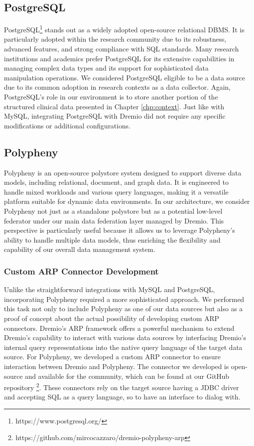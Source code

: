 \subsection{PostgreSQL}
PostgreSQL\footnote{https://www.postgresql.org/} stands out as a widely adopted open-source relational \ac{DBMS}. It is particularly adopted within the research community due to its robustness, advanced features, and strong compliance with \ac{SQL} standards. Many research institutions and academics prefer PostgreSQL for its extensive capabilities in managing complex data types and its support for sophisticated data manipulation operations. We considered PostgreSQL eligible to be a data source due to its common adoption in research contexts as a data collector.
Again, PostgreSQL's role in our environment is to store another portion of the structured clinical data presented in Chapter \ref{chp:context}.
Just like with MySQL, integrating PostgreSQL with Dremio did not require any specific modifications or additional configurations.

\subsection{Polypheny}
Polypheny \cite{DBLP:conf/bigdataconf/VogtSS18} is an open-source polystore system designed to support diverse data models, including relational, document, and graph data. It is engineered to handle mixed workloads and various query languages, making it a versatile platform suitable for dynamic data environments.
In our architecture, we consider Polypheny not just as a standalone polystore but as a potential low-level federator under our main data federation layer managed by Dremio. This perspective is particularly useful because it allows us to leverage Polypheny's ability to handle multiple data models, thus enriching the flexibility and capability of our overall data management system.

\subsubsection{Custom ARP Connector Development}
Unlike the straightforward integrations with MySQL and PostgreSQL, incorporating Polypheny required a more sophisticated approach. We performed this task not only to include Polypheny as one of our data sources but also as a proof of concept about the actual possibility of developing custom \ac{ARP} connectors.
Dremio's \ac{ARP} framework offers a powerful mechanism to extend Dremio's capability to interact with various data sources by interfacing Dremio's internal query representations into the native query language of the target data source.
For Polypheny, we developed a custom \ac{ARP} connector to ensure interaction between Dremio and Polypheny. The connector we developed is open-source and available for the community, which can be found at our GitHub repository \footnote{https://github.com/mircocazzaro/dremio-polypheny-arp}.
These connectors rely on the target source having a \ac{JDBC} driver and accepting \ac{SQL} as a query language, so to have an interface to dialog with.


